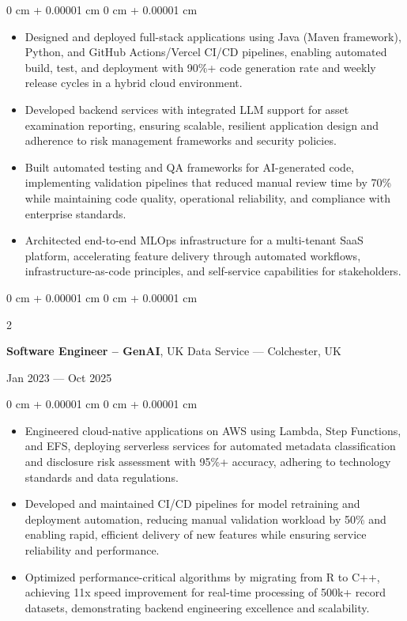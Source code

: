 \documentclass[6pt, letterpaper]{article}
\newenvironment{highlights}{
    \begin{itemize}[
        topsep=0.03 cm,
        parsep=0.03 cm,
        partopsep=0pt,
        itemsep=0pt,
        leftmargin=0 cm + 10pt
    ]
}{
    \end{itemize}
} %
\newenvironment{onecolentry}{
    \begin{adjustwidth}{
        0 cm + 0.00001 cm
    }{
        0 cm + 0.00001 cm
    }
}{
    \end{adjustwidth}
} %
\newenvironment{twocolentry}[2][]{
    \onecolentry
    \def\secondColumn{#2}
    \setcolumnwidth{\fill, 4.5 cm}
    \begin{paracol}{2}
}{
    \switchcolumn \raggedleft \secondColumn
    \end{paracol}
    \endonecolentry
} %
\begin{document}
        \begin{onecolentry}
        \begin{highlights}
            \item Designed and deployed full-stack applications using Java (Maven framework), Python, and GitHub Actions/Vercel CI/CD pipelines, enabling automated build, test, and deployment with 90\%+ code generation rate and weekly release cycles in a hybrid cloud environment.
            \item Developed backend services with integrated LLM support for asset examination reporting, ensuring scalable, resilient application design and adherence to risk management frameworks and security policies.
            \item Built automated testing and QA frameworks for AI-generated code, implementing validation pipelines that reduced manual review time by 70\% while maintaining code quality, operational reliability, and compliance with enterprise standards.
            \item Architected end-to-end MLOps infrastructure for a multi-tenant SaaS platform, accelerating feature delivery through automated workflows, infrastructure-as-code principles, and self-service capabilities for stakeholders.
        \end{highlights}
        \end{onecolentry}

        \begin{twocolentry}{Jan 2023 --- Oct 2025}
        \textbf{Software Engineer – GenAI}, UK Data Service --- Colchester, UK
        \end{twocolentry}

        \begin{onecolentry}
        \begin{highlights}

            \item Engineered cloud-native applications on AWS using Lambda, Step Functions, and EFS, deploying serverless services for automated metadata classification and disclosure risk assessment with 95\%+ accuracy, adhering to technology standards and data regulations.
            \item Developed and maintained CI/CD pipelines for model retraining and deployment automation, reducing manual validation workload by 50\% and enabling rapid, efficient delivery of new features while ensuring service reliability and performance.
            \item Optimized performance-critical algorithms by migrating from R to C++, achieving 11x speed improvement for real-time processing of 500k+ record datasets, demonstrating backend engineering excellence and scalability.
        \end{highlights}
        \end{onecolentry}
\end{document}
